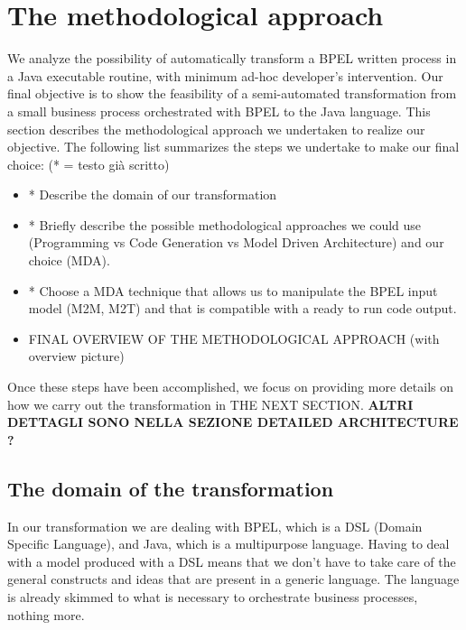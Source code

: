 \section{The methodological approach}
\label{MethodApproach}

We analyze the possibility of automatically transform a BPEL written process in a Java executable routine, with minimum ad-hoc developer’s intervention. Our final objective is to show the feasibility of a semi-automated transformation from a small business process orchestrated with BPEL to the Java language.
This section describes the methodological approach we undertaken to realize our objective. The following list summarizes the steps we undertake to make our final choice: (* = testo già scritto)

\begin{itemize}
 \item * Describe the domain of our transformation
 \item * Briefly describe the possible methodological approaches we could use (Programming vs Code Generation vs Model Driven Architecture) and our choice (MDA). 
 \item * Choose a MDA technique that allows us to manipulate the BPEL input model (M2M, M2T) and that is compatible with a ready to run code output.
 \item FINAL OVERVIEW OF THE METHODOLOGICAL APPROACH (with overview picture)
\end{itemize}  

Once these steps have been accomplished, we focus on providing more details on how we carry out the transformation in THE NEXT SECTION.
\textbf{ALTRI DETTAGLI SONO NELLA SEZIONE DETAILED ARCHITECTURE ? }


\subsection{The domain of the transformation} 
\label{sec:TransfDomain}
In our transformation we are dealing with BPEL, which is a DSL (Domain Specific Language), and Java, which is a multipurpose language. 
Having to deal with a model produced with a DSL means that   we don't have to take care of the general constructs and ideas that are present in a generic language. The language is already skimmed to what is necessary to orchestrate business processes, nothing more.  %
 
